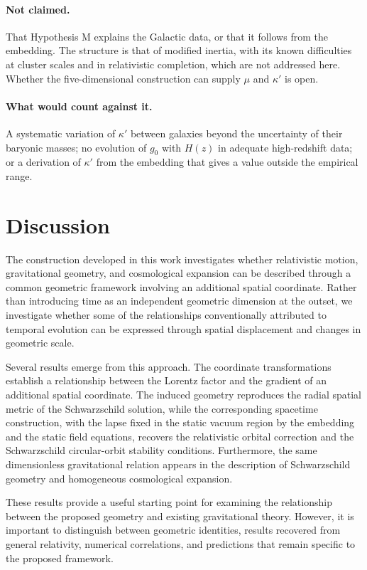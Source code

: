 \documentclass[pdflatex,sn-mathphys-num]{sn-jnl}%
\theoremstyle{thmstyleone}%
\theoremstyle{thmstyletwo}%
\theoremstyle{thmstylethree}%
\begin{document}
\paragraph{Not claimed.} That Hypothesis M explains the Galactic data, or that it follows from the embedding. The structure is that of modified inertia, with its known difficulties at cluster scales and in relativistic completion, which are not addressed here. Whether the five-dimensional construction can supply $\mu$ and $\kappa'$ is open.

\paragraph{What would count against it.} A systematic variation of $\kappa'$ between galaxies beyond the uncertainty of their baryonic masses; no evolution of $g_0$ with $H(z)$ in adequate high-redshift data; or a derivation of $\kappa'$ from the embedding that gives a value outside the empirical range.

\section{Discussion}

The construction developed in this work investigates whether relativistic motion, gravitational geometry, and cosmological expansion can be described through a common geometric framework involving an additional spatial coordinate. Rather than introducing time as an independent geometric dimension at the outset, we investigate whether some of the relationships conventionally attributed to temporal evolution can be expressed through spatial displacement and changes in geometric scale.

Several results emerge from this approach. The coordinate transformations establish a relationship between the Lorentz factor and the gradient of an additional spatial coordinate. The induced geometry reproduces the radial spatial metric of the Schwarzschild solution, while the corresponding spacetime construction, with the lapse fixed in the static vacuum region by the embedding and the static field equations, recovers the relativistic orbital correction and the Schwarzschild circular-orbit stability conditions. Furthermore, the same dimensionless gravitational relation appears in the description of Schwarzschild geometry and homogeneous cosmological expansion.

These results provide a useful starting point for examining the relationship between the proposed geometry and existing gravitational theory. However, it is important to distinguish between geometric identities, results recovered from general relativity, numerical correlations, and predictions that remain specific to the proposed framework.
\end{document}
